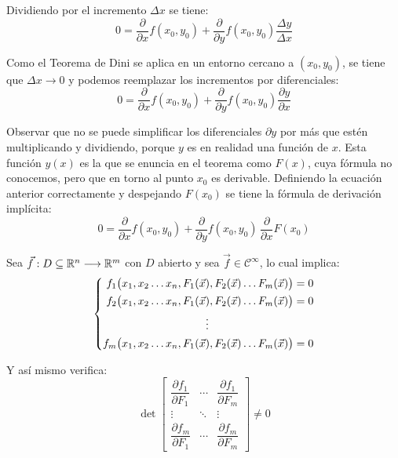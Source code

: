 \documentclass[a5paper,12pt,twoside]{book}
\begin{document}
Dividiendo por el incremento $\Delta x$ se tiene:
\begin{equation*}
    0 = \dfrac{\partial}{\partial x} f(x_0,y_0)+ \dfrac{\partial}{\partial y} f(x_0,y_0) \dfrac{\Delta y}{\Delta x}
\end{equation*}

Como el Teorema de Dini se aplica en un entorno cercano a $(x_0,y_0)$, se tiene que $\Delta x \to 0$ y podemos reemplazar los incrementos por diferenciales:
\begin{equation*}
    0 = \dfrac{\partial}{\partial x} f(x_0,y_0)+ \dfrac{\partial}{\partial y} f(x_0,y_0) \dfrac{\partial y}{\partial x}
\end{equation*}

Observar que no se puede simplificar los diferenciales $\partial y$ por más que estén multiplicando y dividiendo, porque $y$ es en realidad una función de $x$.
Esta función $y(x)$ es la que se enuncia en el teorema como $F(x)$, cuya fórmula no conocemos, pero que en torno al punto $x_0$ es derivable.
Definiendo la ecuación anterior correctamente y despejando $F(x_0)$ se tiene la fórmula de derivación implícita:
\begin{equation*}
    0 = \frac{\partial}{\partial x} f(x_0,y_0)+ \frac{\partial}{\partial y} f(x_0,y_0) \, \frac{\partial}{\partial x} F(x_0)
\end{equation*}


Sea $\Vec{f}:D \subseteq \mathbb{R}^n \longrightarrow \mathbb{R}^m$ con $D$ abierto y sea $\Vec{f} \in \mathcal{C}^\infty$, lo cual implica:
\begin{equation*}
    \left\{
    \begin{aligned}
        f_1 \big( x_1,x_2 \dots x_n, F_1(\Vec{x}), F_2(\Vec{x}) \dots F_m(\Vec{x}) \big) &= 0
        \\
        f_2 \big( x_1,x_2 \dots x_n, F_1(\Vec{x}), F_2(\Vec{x}) \dots F_m(\Vec{x}) \big) &= 0
        \\
        \vdots \hspace{2.7cm} &
        \\
        f_m \big( x_1,x_2 \dots x_n, F_1(\Vec{x}), F_2(\Vec{x}) \dots F_m(\Vec{x}) \big) &= 0
    \end{aligned}
    \right.
\end{equation*}

Y así mismo verifica:
\begin{equation*}
    \operatorname{det}
    \begin{bmatrix}
        \dfrac{\partial f_1}{\partial F_1} & \cdots & \dfrac{\partial f_1}{\partial F_m}
        \\
        \vdots & \ddots & \vdots
        \\
        \dfrac{\partial f_m}{\partial F_1} & \cdots & \dfrac{\partial f_m}{\partial F_m}
    \end{bmatrix}
    \neq 0
\end{equation*}
\end{document}
